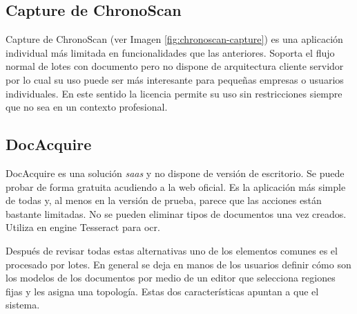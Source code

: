 \subsection{Capture de ChronoScan}

Capture de ChronoScan \cite{solucionesComerciales_chronoScanCapture_chronoScanDocumentCapture} (ver Imagen \ref{fig:chronoscan-capture}) es una aplicación individual más limitada en funcionalidades que las anteriores. Soporta el flujo normal de lotes con documento pero no dispone de arquitectura cliente servidor por lo cual su uso puede ser más interesante para pequeñas empresas o usuarios individuales. En este sentido la licencia permite su uso sin restricciones siempre que no sea en un contexto profesional.

\subsection{DocAcquire}

DocAcquire \cite{solucionesComerciales_docAcquire_docAcquire} es una solución \emph{\acrlong{saas}} y no dispone de versión de escritorio. Se puede probar de forma gratuita acudiendo a la web oficial. Es la aplicación más simple de todas y, al menos en la versión de prueba, parece que las acciones están bastante limitadas. No se pueden eliminar tipos de documentos una vez creados. Utiliza en engine Tesseract para \acrshort{ocr}.

Después de revisar todas estas alternativas uno de los elementos comunes es el procesado por lotes. En general se deja en manos de los usuarios definir cómo son los modelos de los documentos por medio de un editor que selecciona regiones fijas y les asigna una topología. Estas dos características apuntan a que el sistema.

